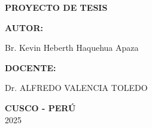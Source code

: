 \begin{center}
\fontsize{14pt}{11pt}\selectfont\bfseries{PROYECTO DE TESIS} 
\end{center}


\hspace{8cm} \textbf{AUTOR:} \nolinebreak
\vspace{-0.3cm}

\hspace{8cm} Br. Kevin Heberth Haquehua Apaza


\hspace{8cm} \textbf{DOCENTE:} \nolinebreak
\vspace{-0.3cm}

\hspace{8cm} Dr. ALFREDO VALENCIA TOLEDO
\vspace{-0.3cm}





\vspace{0.3cm}						

\begin{center}
\Large \textbf{CUSCO - PERÚ} \\  2025
\end{center}

\clearpage